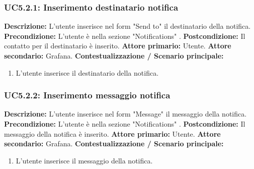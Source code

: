                 \subsubsection{UC5.2.1: Inserimento destinatario notifica }
                    \textbf{Descrizione:} L’utente inserisce nel form "Send to" il destinatario della notifica.
                    \newline
                    \textbf{Precondizione:} L'utente è nella sezione "Notifications" .
                    \newline
                    \textbf{Postcondizione:} Il contatto per il destinatario è inserito.
                    \newline
                    \textbf{Attore primario:} Utente.
                    \newline
                    \textbf{Attore secondario:} Grafana.
                    \newline
                    \textbf{Contestualizzazione / Scenario principale:} \begin{enumerate}
                            \item L'utente inserisce il destinatario della notifica.
                        \end{enumerate}        
                
                
                \subsubsection{UC5.2.2: Inserimento messaggio notifica }
                    \textbf{Descrizione:} L’utente inserisce nel form "Message" il messaggio della notifica.
                    \newline
                    \textbf{Precondizione:} L'utente è nella sezione "Notifications" .
                    \newline
                    \textbf{Postcondizione:} Il messaggio della notifica è inserito.
                    \newline
                    \textbf{Attore primario:} Utente.
                    \newline
                    \textbf{Attore secondario:} Grafana.
                    \newline
                    \textbf{Contestualizzazione / Scenario principale:} \begin{enumerate}
                            \item L'utente inserisce il messaggio della notifica.
                        \end{enumerate} 
                 
